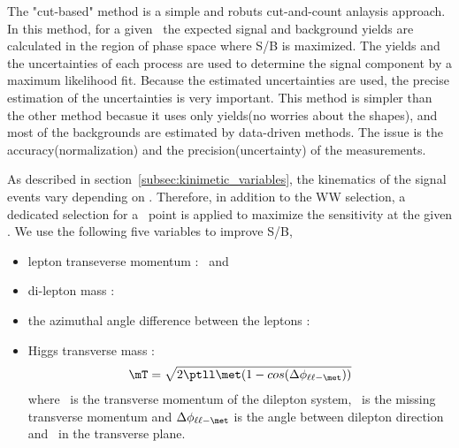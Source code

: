 The "cut-based" method is a simple and robuts cut-and-count anlaysis approach. 
In this method, for a given \mHi\ the expected signal and background yields are 
calculated in the region of phase space where S/B is maximized. 
The yields and the uncertainties of each process are used to determine 
the signal component by a maximum likelihood fit. 
Because the estimated uncertainties are used, the precise estimation
of the uncertainties is very important.  
This method is simpler than the other method becasue it uses only 
yields(no worries about the shapes), 
and most of the backgrounds are estimated by data-driven methods. 
The issue is the accuracy(normalization) and the precision(uncertainty) of the measurements.  

As described in section~\ref{subsec:kinimetic_variables}, the kinematics of 
the signal events vary depending on \mHi. Therefore, 
in addition to the WW selection, a dedicated selection 
for a \mHi\ point is applied to maximize the sensitivity at the given \mHi. 
We use the following five variables to improve S/B, 
\begin{itemize}
\item lepton transeverse momentum : \ptlmax\ and \ptlmin
\item di-lepton mass : \mll 
\item the azimuthal angle difference between the leptons : \delphill
\item Higgs transverse mass : 
\begin{eqnarray} 
\mT = \sqrt{2\ptll\met(1-cos(\Delta\phi_{\ell\ell-\met}))}
\end{eqnarray} 
where \ptll\ is the transverse momentum of the dilepton system,
\met\ is the missing transverse momentum and
$\Delta\phi_{\ell\ell-\met}$ is the angle between dilepton
direction and \met\ in the transverse plane.
\end{itemize}


